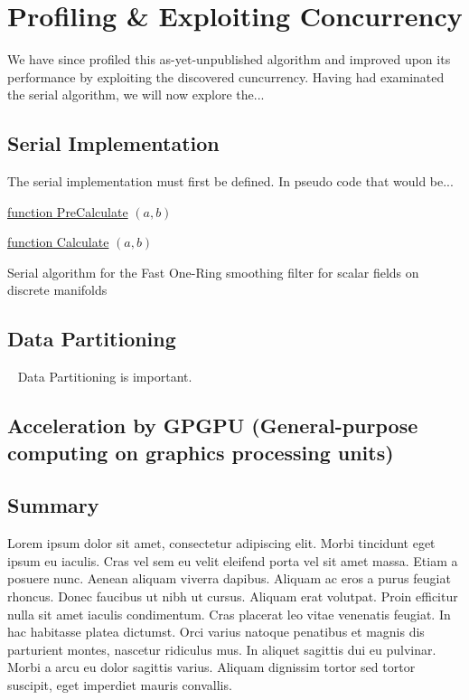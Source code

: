 \chapter{Profiling \& Exploiting Concurrency}

We have since profiled this as-yet-unpublished algorithm and improved upon its performance by exploiting the discovered cuncurrency. Having had examinated the serial algorithm, we will now explore the...

\section{Serial Implementation}
The serial implementation must first be defined. In pseudo code that would be...
\begin{algorithm}

	\underline{function PreCalculate} $(a,b)$\;
	

	\underline{function Calculate} $(a,b)$\;
	
	\caption{Serial algorithm for the Fast One-Ring smoothing filter for scalar fields on discrete manifolds}
\end{algorithm}


\section{Data Partitioning}~\cite[p.~357]{Lang17}
Data Partitioning is important.



\section[Acceleration by GPGPU]{Acceleration by GPGPU (General-purpose 
computing on graphics processing units)}


\section{Summary}
Lorem ipsum dolor sit amet, consectetur adipiscing elit. Morbi tincidunt eget 
ipsum eu iaculis. Cras vel sem eu velit eleifend porta vel sit amet massa. Etiam 
a posuere nunc. Aenean aliquam viverra dapibus. Aliquam ac eros a purus feugiat 
rhoncus. Donec faucibus ut nibh ut cursus. Aliquam erat volutpat. Proin efficitur 
nulla sit amet iaculis condimentum. Cras placerat leo vitae venenatis feugiat. In 
hac habitasse platea dictumst. Orci varius natoque penatibus et magnis dis 
parturient montes, nascetur ridiculus mus. In aliquet sagittis dui eu pulvinar. 
Morbi a arcu eu dolor sagittis varius. Aliquam dignissim tortor sed tortor 
suscipit, eget imperdiet mauris convallis.
